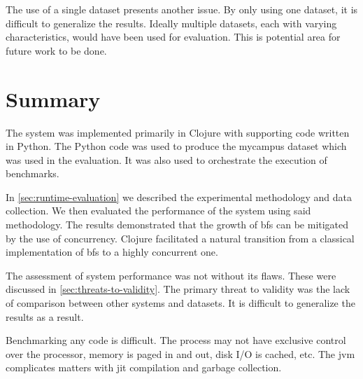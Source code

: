 		The use of a single dataset presents another issue.  By only using one dataset, it is difficult to generalize the results.  Ideally multiple datasets, each with varying characteristics, would have been used for evaluation.  This is potential area for future work to be done.
	
	\section{Summary}
	\label{sec:eval-summary}
		The system was implemented primarily in Clojure with supporting code written in Python.  The Python code was used to produce the mycampus dataset which was used in the evaluation.  It was also used to orchestrate the execution of benchmarks.
		
		In \cref{sec:runtime-evaluation} we described the experimental methodology and data collection.  We then evaluated the performance of the system using said methodology.  The results demonstrated that the growth of \gls{bfs} can be mitigated by the use of concurrency.  Clojure facilitated a natural transition from a classical implementation of \gls{bfs} to a highly concurrent one.
		
		The assessment of system performance was not without its flaws.  These were discussed in \cref{sec:threats-to-validity}.  The primary threat to validity was the lack of comparison between other systems and datasets.  It is difficult to generalize the results as a result.
		
		Benchmarking any code is difficult.  The process may not have exclusive control over the processor, memory is paged in and out, disk I/O is cached, etc.  The \gls{jvm} complicates matters with \gls{jit} compilation and garbage collection.